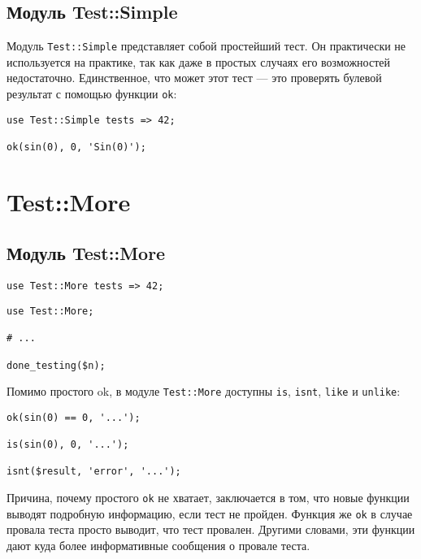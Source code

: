 \subsection{Модуль Test::Simple}
Модуль \verb|Test::Simple| представляет собой простейший тест. Он практически не используется на практике, так как даже в простых случаях его возможностей недостаточно. Единственное, что может этот тест --- это проверять булевой результат с помощью функции \verb|ok|:
\begin{verbatim}
use Test::Simple tests => 42;

ok(sin(0), 0, 'Sin(0)');
\end{verbatim}

\section{Test::More}
\subsection{Модуль Test::More}
\begin{verbatim}
use Test::More tests => 42;
\end{verbatim}
\begin{verbatim}
use Test::More;

# ...

done_testing($n);
\end{verbatim}
Помимо простого ok, в модуле \verb|Test::More| доступны \verb|is|, \verb|isnt|, \verb|like| и \verb|unlike|:
\begin{verbatim}
ok(sin(0) == 0, '...');

is(sin(0), 0, '...');

isnt($result, 'error', '...');
\end{verbatim}
Причина, почему простого \verb|ok| не хватает, заключается в том, что новые функции выводят подробную информацию, если тест не пройден. Функция же \verb|ok| в случае провала теста просто выводит, что тест провален. Другими словами, эти функции дают куда более информативные сообщения о провале теста.

